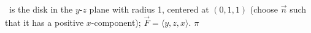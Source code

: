 {\surfaceS\ is the disk in the $y$-$z$ plane with radius 1, centered at $(0,1,1)$ (choose $\vec n$ such that it has a positive $x$-component); $\vec F = \langle y,z,x\rangle$.
}
{$\pi$
}
